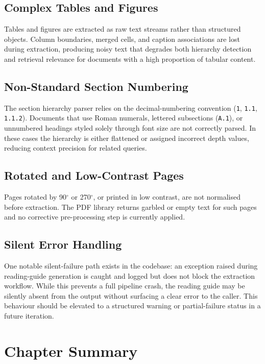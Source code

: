 \documentclass[12pt,a4paper]{report}
\begin{document}
\subsection{Complex Tables and Figures}

Tables and figures are extracted as raw text streams rather than structured
objects. Column boundaries, merged cells, and caption associations are lost
during extraction, producing noisy text that degrades both hierarchy detection
and retrieval relevance for documents with a high proportion of tabular content.

\subsection{Non-Standard Section Numbering}

The section hierarchy parser relies on the decimal-numbering convention
(\texttt{1}, \texttt{1.1}, \texttt{1.1.2}). Documents that use Roman numerals,
lettered subsections (\texttt{A.1}), or unnumbered headings styled solely through
font size are not correctly parsed. In these cases the hierarchy is either
flattened or assigned incorrect depth values, reducing context precision for
related queries.

\subsection{Rotated and Low-Contrast Pages}

Pages rotated by 90$^\circ$ or 270$^\circ$, or printed in low contrast, are not
normalised before extraction. The PDF library returns garbled or empty text for
such pages and no corrective pre-processing step is currently applied.

\subsection{Silent Error Handling}

One notable silent-failure path exists in the codebase: an exception raised
during reading-guide generation is caught and logged but does not block the
extraction workflow. While this prevents a full pipeline crash, the reading guide
may be silently absent from the output without surfacing a clear error to the
caller. This behaviour should be elevated to a structured warning or
partial-failure status in a future iteration.

\section{Chapter Summary}
\end{document}
